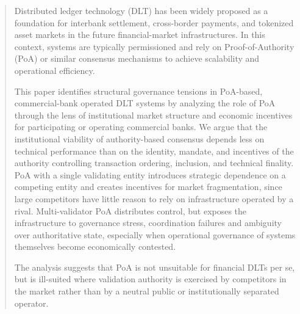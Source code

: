 \documentclass[
reprint,
showkeys,
superscriptaddress,
aps,
pra,
longbibliography,
nofootinbib,
]{revtex4-2}
\theoremstyle{definition}\newtheorem{definition}{Definition}
\begin{document}
	\begin{abstract}
		Distributed ledger technology (DLT) has been widely proposed as a foundation for interbank settlement, cross-border payments, and tokenized asset markets in the future financial-market infrastructures. 
		In this context, systems are typically permissioned and rely on Proof-of-Authority (PoA) or similar consensus mechanisms to achieve scalability and operational efficiency.
		
		 
		This paper identifies structural governance tensions in PoA-based, commercial-bank operated DLT systems by analyzing the role of PoA through the lens of institutional market structure and economic incentives for participating or operating commercial banks.	
		We argue that the institutional viability of authority-based consensus depends less on technical performance than on the identity, mandate, and incentives of the authority controlling transaction ordering, inclusion, and technical finality.
		PoA with a single validating entity introduces strategic dependence on a competing entity and creates incentives for market fragmentation, since large competitors have little reason to rely on infrastructure operated by a rival. 
		Multi-validator PoA distributes control, but exposes the infrastructure to governance stress, coordination failures and ambiguity over authoritative state, especially when operational governance of systems themselves become economically contested.

		The analysis suggests that PoA is not unsuitable for financial DLTs per se, but is ill-suited where validation authority is exercised by competitors in the market rather than by a neutral public or institutionally separated operator.
	\end{abstract}
	
\end{document}
